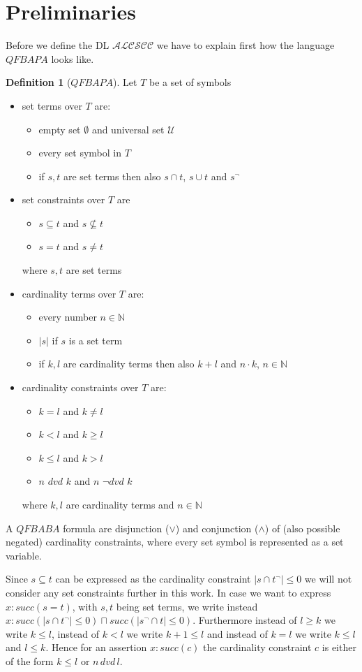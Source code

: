 \documentclass[a4paper,11pt]{scrartcl}
\theoremstyle{break}
\theoremstyle{definition}
\newtheorem{mydef}{Definition}
\begin{document}
\section{Preliminaries}
Before we define the DL $\mathcal{ALCSCC}$ we have to explain first how the language $QFBAPA$ looks like.
\begin{mydef}[$QFBAPA$]
Let $T$ be a set of symbols
\begin{itemize}
\item set terms over $T$ are:
\begin{itemize}
\item empty set $\emptyset$ and universal set $
\mathcal{U}$
\item every set symbol in $T$
\item if $s,t$ are set terms then also $s\cap t$, $s\cup t$ and $s^{\neg}$
\end{itemize}
\item set constraints over $T$ are
\begin{itemize}
\item $s\subseteq t$ and $s\not\subseteq t$
\item $s=t$ and $s\neq t$
\end{itemize}
where $s,t$ are set terms
\item cardinality terms over $T$ are:
\begin{itemize}
\item every number $n\in \mathbb{N}$
\item $|s|$ if $s$ is a set term
\item if $k,l$ are cardinality terms then also $k+l$ and $n\cdot k$, $n\in \mathbb{N}$
\end{itemize}
\item cardinality constraints over $T$ are:
\begin{itemize}
\item $k=l$ and $k\neq l$
\item $k<l$ and $k\geq l$
\item $k\leq l$ and $k>l$
\item $n$ $dvd$ $k$ and $n$ $\neg dvd$ $k$
\end{itemize}
where $k,l$ are cardinality terms and $n\in\mathbb{N}$
\end{itemize}
A $QFBABA$ formula are disjunction ($\vee$) and conjunction ($\wedge$) of (also possible negated) cardinality constraints, where every set symbol is represented as a set variable.
\end{mydef}
Since $s\subseteq t$ can be expressed as the cardinality constraint $|s\cap t^\neg|\leq 0$ we will not consider any set constraints further in this work. In case we want to express $x:succ(s=t)$, with $s,t$ being set terms, we write instead $x:succ(|s\cap t^\neg|\leq 0)\sqcap succ(|s^\neg\cap t|\leq 0)$. Furthermore instead of $l\geq k$ we write $k\leq l$, instead of $k<l$ we write $k+1\leq l$ and instead of $k=l$ we write $k\leq l$ and $l\leq k$. Hence for an assertion $x:succ(c)$ the cardinality constraint $c$ is either of the form $k\leq l$ or $n\,dvd\,l$.\\
\end{document}
